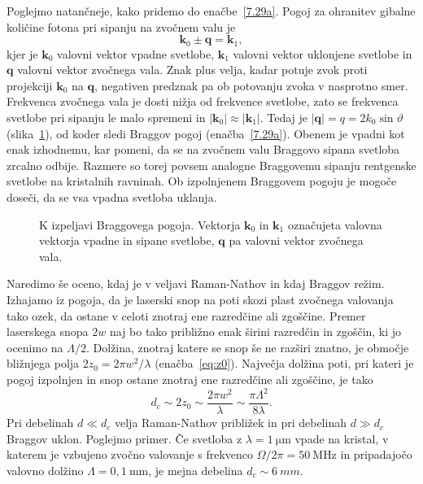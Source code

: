 Poglejmo natančneje, kako pridemo do enačbe~\ref{7.29a}. Pogoj
za ohranitev gibalne količine fotona pri sipanju na zvočnem valu je
\begin{equation}
\mathbf{k}_{0}\pm\mathbf{q}=\mathbf{k}_{1},
\label{7.30}
\end{equation}
kjer je $\mathbf{k}_{0}$ valovni vektor vpadne svetlobe, $\mathbf{k}_{1}$
valovni vektor uklonjene svetlobe in $\mathbf{q}$ valovni
vektor zvočnega vala. Znak plus velja, kadar potuje zvok proti projekciji
$\mathbf{k}_{0}$ na $\mathbf{q}$, negativen predznak pa ob potovanju zvoka v nasprotno smer. 
Frekvenca zvočnega vala je dosti nižja od frekvence svetlobe, zato se frekvenca svetlobe 
pri sipanju le malo spremeni in $|\mathbf{k}_{0}| \approx |\mathbf{k}_{1}|$.
Tedaj je $|\mathbf{q}| = q=2k_{0}\sin\vartheta$ 
(slika~\ref{fig:ao_bragg3}), od koder sledi Braggov pogoj 
(enačba~\ref{7.29a}). Obenem je vpadni kot enak izhodnemu, kar pomeni, da se na
zvočnem valu Braggovo sipana svetloba zrcalno odbije. Razmere so torej
povsem analogne Braggovemu sipanju rentgenske svetlobe na kristalnih
ravninah. Ob izpolnjenem Braggovem pogoju je mogoče doseči, 
da se vsa vpadna svetloba uklanja.
\begin{figure}[ht]
\centering
\def\svgwidth{40truemm} 

\caption{K izpeljavi Braggovega pogoja. Vektorja $\mathbf{k}_0$ in $\mathbf{k}_1$ označujeta
valovna vektorja vpadne in sipane svetlobe, $\mathbf{q}$ pa valovni vektor zvočnega vala.}
\label{fig:ao_bragg3}
\end{figure}
\begin{remark}
Naredimo še oceno, kdaj je v veljavi Raman-Nathov in kdaj Braggov režim. 
Izhajamo iz pogoja, da je laserski snop na poti skozi plast zvočnega 
valovanja tako ozek, da ostane v celoti znotraj
ene razredčine ali zgoščine. Premer laserskega snopa $2w$ naj bo tako približno enak širini
razredčin in zgoščin, ki jo ocenimo na $\Lambda/2$. Dolžina, znotraj katere se snop še ne razširi znatno,
je območje bližnjega polja $2z_0 = 2 \pi w^2/\lambda$ (enačba~\ref{eq:z0}). Največja dolžina poti, pri 
kateri je pogoj izpolnjen in snop ostane znotraj ene razredčine ali zgoščine, je tako
\begin{equation}
d_c \sim 2z_0 \sim \frac{2 \pi w^2}{\lambda} \sim \frac{\pi \Lambda^2}{8 \lambda}.
\end{equation}
Pri debelinah $d \ll d_c$ velja Raman-Nathov približek in pri debelinah $d \gg d_c$ Braggov uklon.
Poglejmo primer. Če svetloba z $\lambda = 1~\si{\micro\metre}$ vpade na kristal, 
v katerem je vzbujeno zvočno valovanje s frekvenco $\Omega/2\pi = 50~\si{\mega\hertz}$ in
pripadajočo valovno dolžino $\Lambda = 0,1~\si{\milli\metre}$, je mejna debelina $d_c \sim 6~\si{mm}$.
\end{remark}


